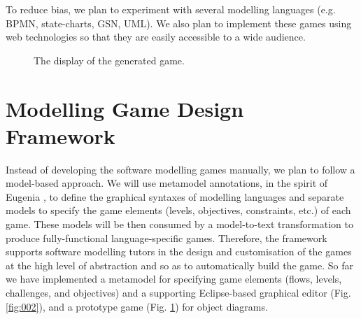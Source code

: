 \documentclass[12pt, a4paper]{report}
\begin{document}
To reduce bias, we plan to experiment with several modelling languages (e.g. BPMN, state-charts, GSN, UML). We also plan to implement these games using web technologies so that they are easily accessible to a wide audience.

\begin{figure}[ht]
\centering
{}
\caption{The display of the generated game.}
\label{fig:001}
\end{figure}

\section{Modelling Game Design Framework}
Instead of developing the software modelling games manually, we plan to follow a model-based approach. We will use metamodel annotations, in the spirit of Eugenia \cite{kolovos2015eugenia}, to define the graphical syntaxes of modelling languages and separate models to specify the game elements (levels, objectives, constraints, etc.) of each game. These models will be then consumed by a model-to-text transformation to produce fully-functional language-specific games. Therefore, the framework supports software modelling tutors in the design and customisation of the games at the high level of abstraction and so as to automatically build the game. So far we have implemented a metamodel for specifying game elements (flows, levels, challenges, and objectives) and a supporting Eclipse-based graphical editor (Fig. \ref{fig:002}), and a prototype game (Fig. \ref{fig:001}) for object diagrams. 
\end{document}
